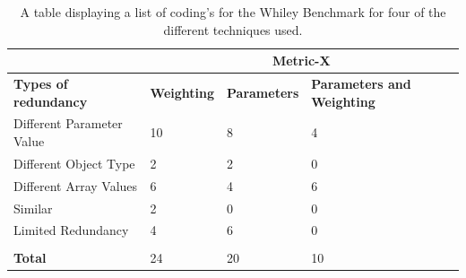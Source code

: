 \begin{table}[H]
\centering
\label{metriccoding}
\begin{tabular}{|l|l|l|l|}
\hline
                          & \multicolumn{3}{c|}{{\bf Metric-X}}                   \\ \hline
{\bf Types of redundancy} & {\bf Weighting} & {\bf Parameters} & {\bf Parameters and Weighting} \\ \hline
Different Parameter Value & 10              & 8                & 4                \\ \hline
Different Object Type     & 2               & 2                & 0                \\ \hline
Different Array Values    & 6               & 4                & 6                \\ \hline
Similar                      & 2               & 0                & 0                \\ \hline
Limited Redundancy        & 4               & 6                & 0                \\ \hline
                          &                 &                  &                  \\ \hline
{\bf Total}               & 24              & 20               & 10               \\ \hline
\end{tabular}
\caption{A table displaying a list of coding's for the Whiley Benchmark for four of the different techniques used.}

\end{table}
